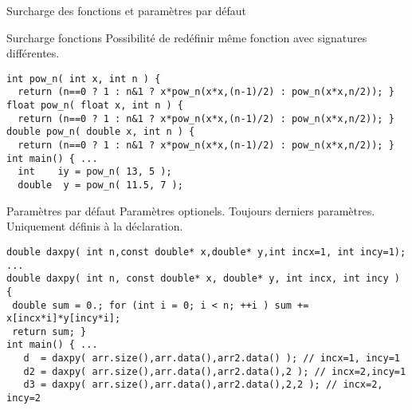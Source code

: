 \documentclass[handout,10pt]{beamer}
\begin{document}
\begin{frame}[fragile]{Surcharge des fonctions et paramètres par défaut}
\tiny
\begin{block}{Surcharge fonctions}
Possibilité de redéfinir même fonction avec signatures différentes.
\begin{lstlisting}
int pow_n( int x, int n ) { 
  return (n==0 ? 1 : n&1 ? x*pow_n(x*x,(n-1)/2) : pow_n(x*x,n/2)); }
float pow_n( float x, int n ) { 
  return (n==0 ? 1 : n&1 ? x*pow_n(x*x,(n-1)/2) : pow_n(x*x,n/2)); }
double pow_n( double x, int n ) { 
  return (n==0 ? 1 : n&1 ? x*pow_n(x*x,(n-1)/2) : pow_n(x*x,n/2)); }
int main() { ...
  int    iy = pow_n( 13, 5 );
  double  y = pow_n( 11.5, 7 );
\end{lstlisting}
\end{block}

\begin{block}{Paramètres par défaut}
Paramètres optionels. Toujours derniers paramètres. Uniquement définis à la déclaration.
\begin{lstlisting}
double daxpy( int n,const double* x,double* y,int incx=1, int incy=1);
...
double daxpy( int n, const double* x, double* y, int incx, int incy ) {
 double sum = 0.; for (int i = 0; i < n; ++i ) sum += x[incx*i]*y[incy*i];
 return sum; }
int main() { ...
   d  = daxpy( arr.size(),arr.data(),arr2.data() ); // incx=1, incy=1
   d2 = daxpy( arr.size(),arr.data(),arr2.data(),2 ); // incx=2,incy=1
   d3 = daxpy( arr.size(),arr.data(),arr2.data(),2,2 ); // incx=2, incy=2
\end{lstlisting}
\end{block}

\end{frame}
\end{document}
